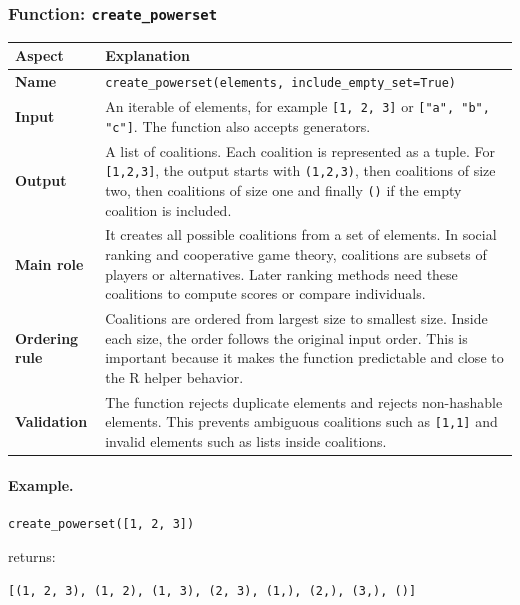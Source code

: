 \documentclass[11pt]{article}
\begin{document}
\subsubsection*{Function: \texttt{create\_powerset}}

\begin{center}
\begin{tabularx}{0.95\linewidth}{@{}p{4cm}Y@{}}
\toprule
\textbf{Aspect} & \textbf{Explanation} \\
\midrule
\textbf{Name}
& \texttt{create\_powerset(elements, include\_empty\_set=True)} \\
\textbf{Input}
& An iterable of elements, for example \texttt{[1, 2, 3]} or
\texttt{["a", "b", "c"]}. The function also accepts generators. \\
\textbf{Output}
& A list of coalitions. Each coalition is represented as a tuple. For
\texttt{[1,2,3]}, the output starts with \texttt{(1,2,3)}, then coalitions of
size two, then coalitions of size one and finally \texttt{()} if the empty
coalition is included. \\
\textbf{Main role}
& It creates all possible coalitions from a set of elements. In social ranking
and cooperative game theory, coalitions are subsets of players or alternatives.
Later ranking methods need these coalitions to compute scores or compare
individuals. \\
\textbf{Ordering rule}
& Coalitions are ordered from largest size to smallest size. Inside each size,
the order follows the original input order. This is important because it makes
the function predictable and close to the R helper behavior. \\
\textbf{Validation}
& The function rejects duplicate elements and rejects non-hashable elements.
This prevents ambiguous coalitions such as \texttt{[1,1]} and invalid elements
such as lists inside coalitions. \\
\bottomrule
\end{tabularx}
\end{center}

\paragraph{Example.}

\begin{verbatim}
create_powerset([1, 2, 3])
\end{verbatim}

\noindent returns:

\begin{verbatim}
[(1, 2, 3), (1, 2), (1, 3), (2, 3), (1,), (2,), (3,), ()]
\end{verbatim}
\end{document}
